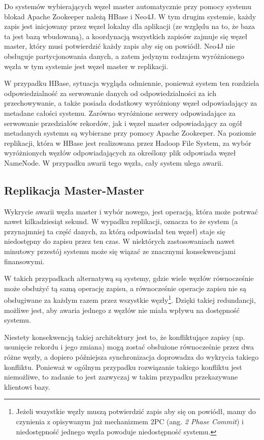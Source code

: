 Do systemów wybierających węzeł master automatycznie przy pomocy systemu blokad Apache Zookeeper należą HBase i Neo4J.
W tym drugim systemie, każdy zapis jest inicjowany przez węzeł lokalny dla aplikacji (ze względu na to, że baza ta jest bazą wbudowaną), a koordynacją wszystkich zapisów zajmuje się węzeł master, który musi potwierdzić każdy zapis aby się on powiódł.
Neo4J nie obsługuje partycjonowania danych, a zatem jedynym rodzajem wyróżnionego węzła w tym systemie jest węzeł master w replikacji.

W przypadku HBase, sytuacja wygląda odmiennie, ponieważ system ten rozdziela odpowiedzialność za serwowanie danych od odpowiedzialności za ich przechowywanie, a także posiada dodatkowy wyróżniony węzeł odpowiadający za metadane całości systemu.
Zarówno wyróżnione serwery odpowiadające za serwowanie przedziałów rekordów, jak i węzeł master odpowiadający za ogół metadanych systemu są wybierane przy pomocy Apache Zookeeper.
Na poziomie replikacji, która w HBase jest realizowana przez Hadoop File System, za wybór wyróżnionych węzłów odpowiadających za określony plik odpowiada węzeł NameNode.
W przypadku awarii tego węzła, cały system ulega awarii.

\subsection*{Replikacja Master-Master}

Wykrycie awarii węzła master i wybór nowego, jest operacją, która może potrwać nawet kilkadziesiąt sekund.
W wypadku replikacji, oznacza to że system (a przynajmniej ta część danych, za którą odpowiadał ten węzeł) staje się niedostępny do zapisu przez ten czas.
W niektórych zastosowaniach nawet minutowy przestój systemu może się wiązać ze znacznymi konsekwencjami finansowymi.

W takich przypadkach alternatywą są systemy, gdzie wiele węzłów równocześnie może obsłużyć tą samą operację zapisu, a równocześnie operacje zapisu nie są obsługiwane za każdym razem przez wszystkie węzły\footnote{Jeżeli wszystkie węzły muszą potwierdzić zapis aby się on powiódł, mamy do czynienia z opisywanym już mechanizmem 2PC (ang. \emph{2 Phase Commit}) i niedostępność jednego węzła powoduje niedostępność systemu.}.
Dzięki takiej redundancji, możliwe jest, aby awaria jednego z węzłów nie miała wpływu na dostępność systemu.

Niestety konsekwencją takiej architektury jest to, że konfliktujące zapisy (np. usunięcie rekordu i jego zmiana) mogą zostać obsłużone równocześnie przez dwa różne węzły,  a dopiero późniejsza synchronizacja doprowadza do wykrycia takiego konfliktu.
Ponieważ w ogólnym przypadku rozwiązanie takiego konfliktu jest niemożliwe, to zadanie to jest zazwyczaj w takim przypadku przekazywane klientowi bazy.

